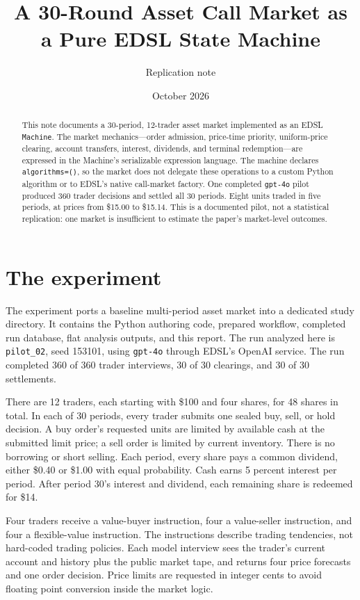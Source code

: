 \documentclass[11pt]{article}
\title{\vspace{-1.1em}A 30-Round Asset Call Market as a Pure EDSL State Machine}
\author{Replication note}
\date{October 2026}
\newcommand{\code}[1]{\texttt{\small #1}}
\begin{document}
\maketitle
\begin{abstract}
This note documents a 30-period, 12-trader asset market implemented as an EDSL
\code{Machine}. The market mechanics---order admission, price-time priority,
uniform-price clearing, account transfers, interest, dividends, and terminal
redemption---are expressed in the Machine's serializable expression language.
The machine declares \code{algorithms=()}, so the market does not delegate
these operations to a custom Python algorithm or to EDSL's native call-market
factory. One completed \code{gpt-4o} pilot produced 360 trader decisions and
settled all 30 periods. Eight units traded in five periods, at prices from
\$15.00 to \$15.14. This is a documented pilot, not a statistical replication:
one market is insufficient to estimate the paper's market-level outcomes.
\end{abstract}

\tableofcontents
\newpage

\section{The experiment}
The experiment ports a baseline multi-period asset market into a dedicated
study directory. It contains
the Python authoring code, prepared workflow, completed run database, flat
analysis outputs, and this report. The run analyzed here is \code{pilot\_02},
seed 153101, using \code{gpt-4o} through EDSL's OpenAI service. The run completed
360 of 360 trader interviews, 30 of 30 clearings, and 30 of 30 settlements.

There are 12 traders, each starting with \$100 and four shares, for 48 shares
in total. In each of 30 periods, every trader submits one sealed buy, sell, or
hold decision. A buy order's requested units are limited by available cash at
the submitted limit price; a sell order is limited by current inventory. There
is no borrowing or short selling. Each period, every share pays a common
dividend, either \$0.40 or \$1.00 with equal probability. Cash earns 5 percent
interest per period. After period 30's interest and dividend, each remaining
share is redeemed for \$14.

Four traders receive a value-buyer instruction, four a value-seller
instruction, and four a flexible-value instruction. The instructions describe
trading tendencies, not hard-coded trading policies. Each model interview sees
the trader's current account and history plus the public market tape, and
returns four price forecasts and one order decision. Price limits are requested
in integer cents to avoid floating point conversion inside the market logic.
\end{document}
